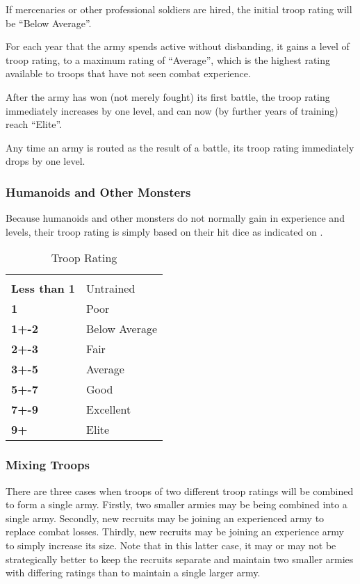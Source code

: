 \begin{multicols*}{2}
If mercenaries or other professional soldiers are hired, the initial troop rating will be “Below Average”.

For each year that the army spends active without disbanding, it gains a level of troop rating, to a maximum rating of “Average”, which is the highest rating available to troops that have not seen combat experience.

After the army has won (not merely fought) its first battle, the troop rating immediately increases by one level, and can now (by further years of training) reach “Elite”.

Any time an army is routed as the result of a battle, its troop rating immediately drops by one level.

\subsubsection{Humanoids and Other Monsters}
Because humanoids and other monsters do not normally gain in experience and levels, their troop rating is simply based on their hit dice as indicated on .

\begin {table}[H]
	\caption{Troop Rating}\label{tab:Troop Rating}
  \begin{tabularx}{\columnwidth}{>{\bfseries}YY}
	 & \\
	Less than 1 & Untrained\\
	1 & Poor\\
	1+-2 & Below Average\\
	2+-3 & Fair\\
	3+-5 & Average\\
	5+-7 & Good\\
	7+-9 & Excellent\\
	9+ & Elite
  \end {tabularx}
\end {table}

\subsubsection{Mixing Troops}
There are three cases when troops of two different troop ratings will be combined to form a single army. Firstly, two smaller armies may be being combined into a single army. Secondly, new recruits may be joining an experienced army to replace combat losses. Thirdly, new recruits may be joining an experience army to simply increase its size. Note that in this latter case, it may or may not be strategically better to keep the recruits separate and maintain two smaller armies with differing ratings than to maintain a single larger army.


\end{multicols*}
